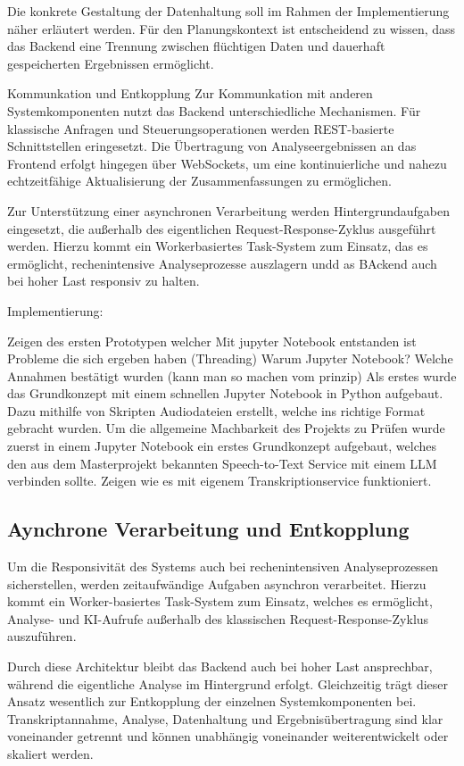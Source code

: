 Die konkrete Gestaltung der Datenhaltung soll im Rahmen der Implementierung näher erläutert werden. Für den Planungskontext ist entscheidend zu wissen, dass das Backend eine Trennung zwischen flüchtigen Daten und dauerhaft gespeicherten Ergebnissen ermöglicht. 

Kommunkation und Entkopplung
Zur Kommunkation mit anderen Systemkomponenten nutzt das Backend unterschiedliche Mechanismen. Für klassische Anfragen und Steuerungsoperationen werden REST-basierte Schnittstellen eringesetzt. Die Übertragung von Analyseergebnissen an das Frontend erfolgt hingegen über WebSockets, um eine kontinuierliche und nahezu echtzeitfähige Aktualisierung der Zusammenfassungen zu ermöglichen. 

Zur Unterstützung einer asynchronen Verarbeitung werden Hintergrundaufgaben eingesetzt, die außerhalb des eigentlichen Request-Response-Zyklus ausgeführt werden. Hierzu kommt ein Workerbasiertes Task-System zum Einsatz, das es ermöglicht, rechenintensive Analyseprozesse auszlagern undd as BAckend auch bei hoher Last responsiv zu halten.

Implementierung: 

Zeigen des ersten Prototypen welcher Mit jupyter Notebook entstanden ist
Probleme die sich ergeben haben (Threading) 
Warum Jupyter Notebook?
Welche Annahmen bestätigt wurden (kann man so machen vom prinzip)
Als erstes wurde das Grundkonzept mit einem schnellen Jupyter Notebook in Python aufgebaut. Dazu mithilfe von Skripten Audiodateien erstellt, welche ins richtige Format gebracht wurden. 
Um die allgemeine Machbarkeit des Projekts zu Prüfen wurde zuerst in einem Jupyter Notebook ein erstes Grundkonzept aufgebaut, welches den aus dem Masterprojekt bekannten Speech-to-Text Service mit einem LLM verbinden sollte. 
Zeigen wie es mit eigenem Transkriptionservice funktioniert. 


\subsection{Aynchrone Verarbeitung und Entkopplung}
Um die Responsivität des Systems auch bei rechenintensiven Analyseprozessen sicherstellen, werden zeitaufwändige Aufgaben asynchron verarbeitet. Hierzu kommt ein Worker-basiertes Task-System zum Einsatz, welches es ermöglicht, Analyse- und KI-Aufrufe außerhalb des klassischen Request-Response-Zyklus auszuführen. 

Durch diese Architektur bleibt das Backend auch bei hoher Last ansprechbar, während die eigentliche Analyse im Hintergrund erfolgt. Gleichzeitig trägt dieser Ansatz wesentlich zur Entkopplung der einzelnen Systemkomponenten bei. Transkriptannahme, Analyse, Datenhaltung und Ergebnisübertragung sind klar voneinander getrennt und können unabhängig voneinander weiterentwickelt oder skaliert werden. 

